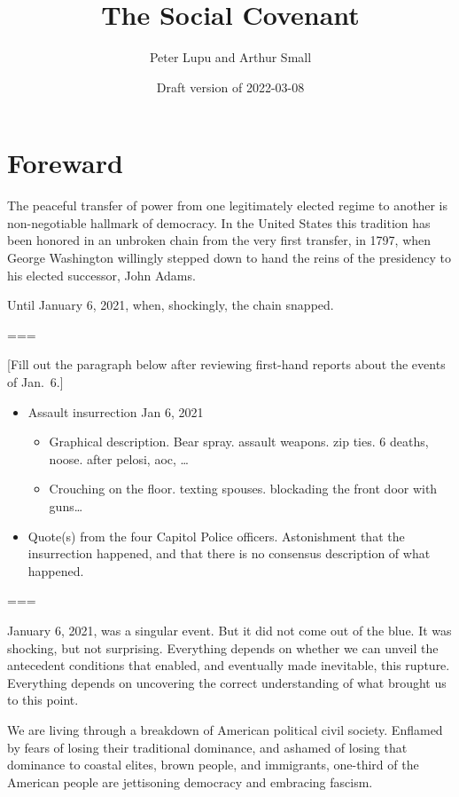 \documentclass[
]{book}
\title{The Social Covenant}
\author{Peter Lupu and Arthur Small}
\date{Draft version of 2022-03-08}
\providecommand{\tightlist}{%
  \setlength{\itemsep}{0pt}\setlength{\parskip}{0pt}}
\begin{document}
\maketitle

{
\setcounter{tocdepth}{1}
\tableofcontents
}
\hypertarget{foreward}{%
\chapter*{Foreward}\label{foreward}}

The peaceful transfer of power from one legitimately elected regime to another is non-negotiable hallmark of democracy. In the United States this tradition has been honored in an unbroken chain from the very first transfer, in 1797, when George Washington willingly stepped down to hand the reins of the presidency to his elected successor, John Adams.

Until January 6, 2021, when, shockingly, the chain snapped.

===

{[}Fill out the paragraph below after reviewing first-hand reports about the events of Jan.~6.{]}

\begin{itemize}
\tightlist
\item
  Assault insurrection Jan 6, 2021

  \begin{itemize}
  \tightlist
  \item
    Graphical description. Bear spray. assault weapons. zip ties. 6 deaths, noose. after pelosi, aoc, \ldots{}
  \item
    Crouching on the floor. texting spouses. blockading the front door with guns\ldots{}
  \end{itemize}
\item
  Quote(s) from the four Capitol Police officers. Astonishment that the insurrection happened, and that there is no consensus description of what happened.
\end{itemize}

===

January 6, 2021, was a singular event. But it did not come out of the blue. It was shocking, but not surprising. Everything depends on whether we can unveil the antecedent conditions that enabled, and eventually made inevitable, this rupture. Everything depends on uncovering the correct understanding of what brought us to this point.

We are living through a breakdown of American political civil society. Enflamed by fears of losing their traditional dominance, and ashamed of losing that dominance to coastal elites, brown people, and immigrants, one-third of the American people are jettisoning democracy and embracing fascism.
\end{document}
